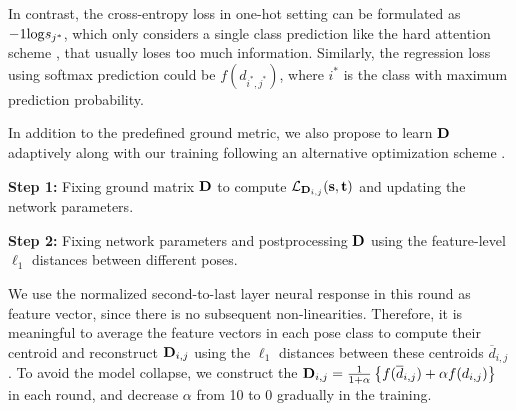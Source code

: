 In contrast, the cross-entropy loss in one-hot setting can be formulated as $-1{\rm log}s_{j^*}$, which only considers a single class prediction like the hard attention scheme \cite{liu2018dependency,liu2019dependency,liu2019permutation}, that usually loses too much information. Similarly, the regression loss using softmax prediction could be $f(d_{i^*,j^*})$, where $i^*$ is the class with maximum prediction probability.


In addition to the predefined ground metric, we also propose to learn ${\rm\textbf{D}}$ adaptively along with our training following an alternative optimization scheme \cite{liu2018joint}.

\noindent\textbf{Step 1:} Fixing ground matrix ${\rm\textbf{D}}$ to compute $\mathcal{L}_{{\rm\textbf{D}}_{i,j}}({\rm{\textbf{s},\textbf{t}}})$ and updating the network parameters.

\noindent\textbf{Step 2:} Fixing network parameters and postprocessing ${\rm\textbf{D}}$ using the feature-level $\ell_1$ distances between different poses.

We use the normalized second-to-last layer neural response in this round as feature vector, since there is no subsequent non-linearities. Therefore, it is meaningful to average the feature vectors in each pose class to compute their centroid and reconstruct ${{\rm\textbf{D}}_{i,j}}$ using the $\ell_1$ distances between these centroids $\overline{d}_{i,j}$. To avoid the model collapse, we construct the ${{\rm\textbf{D}}_{i,j}=\frac{1}{1+\alpha}\left\{f(\overline{d}_{i,j})+\alpha f(d_{i,j})\right\}}$ in each round, and decrease $\alpha$ from 10 to 0 gradually in the training.   
 

 







